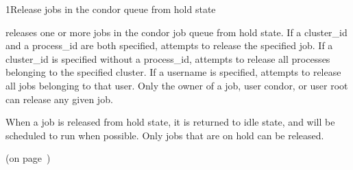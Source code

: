 \begin{ManPage}{}{1}{Release jobs in the condor queue from hold state}
\label{man-condor-release}
\Synopsis {}


\Description

 releases one or more jobs in the condor job queue from hold state.  If a
cluster\_id and a process\_id are both specified,  attempts to
release the specified job. If a cluster\_id is specified
without a process\_id,  attempts to release all processes belonging
to the specified cluster. If a username is specified,  attempts to
release all jobs belonging to that user. Only the owner of a job, user condor,
or user root can release any given job.

When a job is released from hold state, it is returned to idle state, and will be scheduled
to run when possible. Only jobs that are on hold can be released.

\begin{Options}
\end{Options}

\SeeAlso
{} (on page~\pageref{man-condor-hold})

\end{ManPage}
